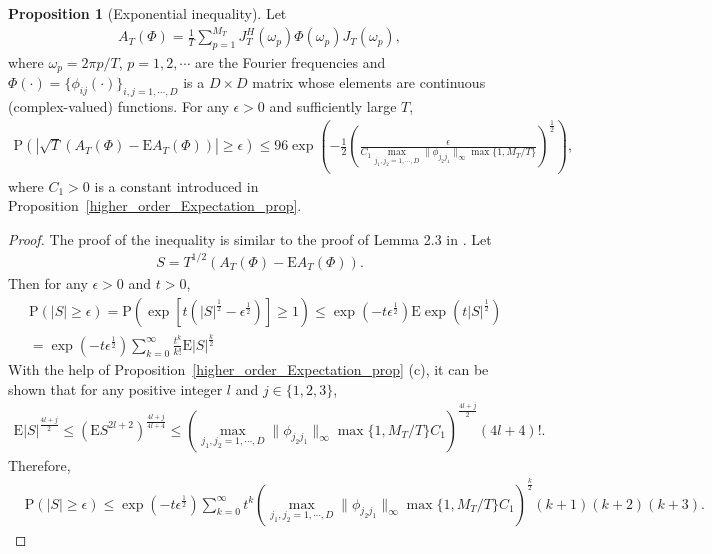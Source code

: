 \documentclass[11pt]{article}
\numberwithin{equation}{section}
\theoremstyle{plain}
\theoremstyle{definition}
\theoremstyle{definition}
\theoremstyle{assumption}
\theoremstyle{proposition}
\newtheorem{proposition}{Proposition}[section]
\theoremstyle{proposition}
\theoremstyle{example}
\theoremstyle{lemma}
\theoremstyle{theorem}
\theoremstyle{remark}
\begin{document}
\begin{proposition}[Exponential inequality]\label{concentration_ineq_strong_prop}
Let
\begin{align*}
A_T(\Phi) = \frac{1}{T}\sum_{p=1}^{M_T} J_T^{H}(\omega_p)\Phi(\omega_p) J_T(\omega_p),
\end{align*}
where $\omega_p = 2\pi p/T$, $p=1,2,\cdots$ are the Fourier frequencies and $\Phi(\cdot) = \{\phi_{ij}(\cdot)\}_{i,j=1,\cdots,D}$ is a $D\times D$ matrix whose elements are continuous (complex-valued) functions. For any $\epsilon>0$ and sufficiently large $T$,
\begin{align*}
\mathrm{P}\left(|\sqrt{T}(A_T(\Phi) - \mathrm{E}A_T(\Phi))| \geqslant \epsilon\right) \leqslant 96\exp\left(-\frac{1}{2} \left(\frac{\epsilon}{C_1 \max_{j_{1},j_{2} = 1,\cdots,D}\|\phi_{j_{2} j_{1}}\|_{\infty}\max\{1, M_T/T\}} \right)^{\frac{1}{2}}\right),
\end{align*}
where $C_1>0$ is a constant introduced in Proposition~\ref{higher_order_Expectation_prop}.
\begin{proof}
The proof of the inequality is similar to the proof of Lemma 2.3 in \citet{Dahlhaus1988}. Let
\begin{align*}
S = T^{1/2}(A_T(\Phi) - \mathrm{E}A_T(\Phi)).
\end{align*}
Then for any $\epsilon>0$ and $t>0$,
\begin{align*}
&\mathrm{P}\left(|S| \geqslant \epsilon\right)
=\mathrm{P}\left(\exp\left[t(|S|^{\frac{1}{2}} - \epsilon^{\frac{1}{2}})\right]\geqslant 1\right)
\leqslant \exp(-t \epsilon^{\frac{1}{2}})\mathrm{E}\exp(t |S|^{\frac{1}{2}}) \\
&=\exp(-t \epsilon^{\frac{1}{2}})\sum_{k=0}^{\infty}\frac{t^k}{k!}\mathrm{E}|S|^{\frac{k}{2}}
\end{align*}
With the help of Proposition~\ref{higher_order_Expectation_prop} (c), it can be shown that for any positive integer $l$ and $j\in\{1,2,3\}$,
\begin{align*}
\mathrm{E}|S|^{\frac{4l+j}{2}} \leqslant \left(\mathrm{E}S^{2l+2}\right)^{\frac{4l+j}{4l+4}}
\leqslant \left(\max_{j_{1},j_{2} = 1,\cdots,D}\|\phi_{j_{2} j_{1}}\|_{\infty}\max\{1, M_T/T\}C_1\right)^{\frac{4l+j}{2}} (4l+4)! .
\end{align*}
Therefore,
\begin{align*}
&\mathrm{P}\left(|S| \geqslant \epsilon\right)
\leqslant \exp(-t \epsilon^{\frac{1}{2}})\sum_{k=0}^{\infty} t^k\left(\max_{j_{1},j_{2} = 1,\cdots,D}\|\phi_{j_{2} j_{1}}\|_{\infty}\max\{1, M_T/T\}C_1\right)^{\frac{k}{2}}(k+1)(k+2)(k+3) .

\end{align*}
\end{proof}
\end{proposition}
\end{document}
